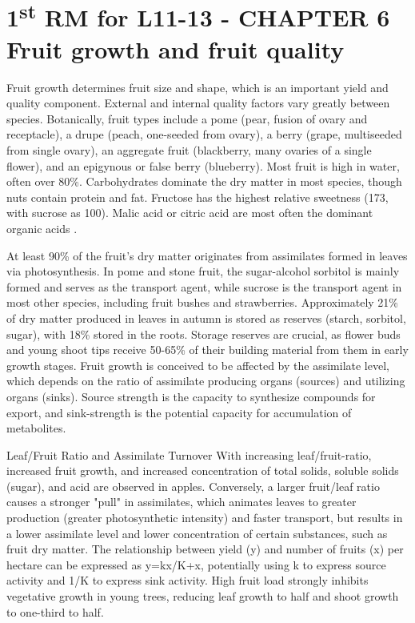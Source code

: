 \section{\texorpdfstring{1\textsuperscript{st} RM for L11-13 - CHAPTER 6 Fruit growth and fruit quality}{1st RM for L11-13 - CHAPTER 6 Fruit growth and fruit quality}}

Fruit growth determines fruit size and shape, which is an important yield and quality component. External and internal quality factors vary greatly between species. Botanically, fruit types include a pome (pear, fusion of ovary and receptacle), a drupe (peach, one-seeded from ovary), a berry (grape, multiseeded from single ovary), an aggregate fruit (blackberry, many ovaries of a single flower), and an epigynous or false berry (blueberry). Most fruit is high in water, often over 80\%. Carbohydrates dominate the dry matter in most species, though nuts contain protein and fat. Fructose has the highest relative sweetness (173, with sucrose as 100). Malic acid or citric acid are most often the dominant organic acids \cite*{rm_07.1_L11_13_fruit_growth_quality}.

\vspace{0.5em}
At least 90\% of the fruit's dry matter originates from assimilates formed in leaves via photosynthesis. In pome and stone fruit, the sugar-alcohol sorbitol is mainly formed and serves as the transport agent, while sucrose is the transport agent in most other species, including fruit bushes and strawberries. Approximately 21\% of dry matter produced in leaves in autumn is stored as reserves (starch, sorbitol, sugar), with 18\% stored in the roots. Storage reserves are crucial, as flower buds and young shoot tips receive 50-65\% of their building material from them in early growth stages.
Fruit growth is conceived to be affected by the assimilate level, which depends on the ratio of assimilate producing organs (sources) and utilizing organs (sinks). Source strength is the capacity to synthesize compounds for export, and sink-strength is the potential capacity for accumulation of metabolites.

\vspace{0.5em}
Leaf/Fruit Ratio and Assimilate Turnover
With increasing leaf/fruit-ratio, increased fruit growth, and increased concentration of total solids, soluble solids (sugar), and acid are observed in apples. Conversely, a larger fruit/leaf ratio causes a stronger "pull" in assimilates, which animates leaves to greater production (greater photosynthetic intensity) and faster transport, but results in a lower assimilate level and lower concentration of certain substances, such as fruit dry matter. The relationship between yield (y) and number of fruits (x) per hectare can be expressed as y=kx/K+x, potentially using k to express source activity and 1/K to express sink activity. High fruit load strongly inhibits vegetative growth in young trees, reducing leaf growth to half and shoot growth to one-third to half.


